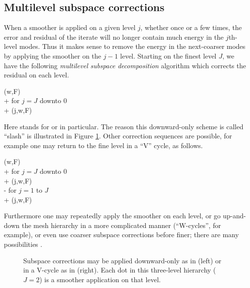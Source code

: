 \documentclass[letterpaper,final,12pt,reqno]{amsart}
\theoremstyle{claim}
\numberwithin{equation}{section}
\numberwithin{figure}{section}
\numberwithin{table}{section}
\numberwithin{theorem}{section}
\begin{document}
\subsection*{Multilevel subspace corrections}  When a smoother is applied on a given level $j$, whether once or a few times, the error and residual of the iterate will no longer contain much energy in the $j$th-level modes.  Thus it makes sense to remove the energy in the next-coarser modes by applying the smoother on the $j-1$ level.  Starting on the finest level $J$, we have the following \emph{multilevel subspace decomposition} algorithm which corrects the residual on each level.
\begin{pseudo*} \label{ps:msd-slash}
(w,F)\text{:} \\+
    for $j=J$ downto $0$ \\+
        (j,w,F)
\end{pseudo*}
Here  stands for  or  in particular.  The reason this downward-only scheme is called ``slash'' is illustrated in Figure \ref{fig:msdcycles}.  Other correction sequences are possible, for example one may return to the fine level in a ``V'' cycle, as follows.
\begin{pseudo*} \label{ps:msd-vcycle}
(w,F)\text{:} \\+
    for $j=J$ downto $0$ \\+
        (j,w,F) \\-
    for $j=1$ to $J$ \\+
        (j,w,F)
\end{pseudo*}
Furthermore one may repeatedly apply the smoother on each level, or go up-and-down the mesh hierarchy in a more complicated manner (``W-cycles'', for example), or even use coarser subspace corrections before finer; there are many possibilities \cite{Briggsetal2000,Trottenbergetal2001}.

\begin{figure}

\caption{Subspace corrections may be applied downward-only as in  (left) or in a V-cycle as in  (right).  Each dot in this three-level hierarchy ($J=2$) is a smoother application on that level.}
\label{fig:msdcycles}
\end{figure}
\end{document}

